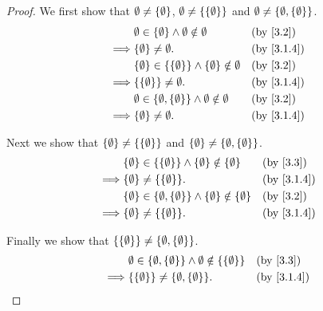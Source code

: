 \begin{proof}
  We first show that \(\emptyset \neq \left\lbrace\emptyset\right\rbrace\), \(\emptyset \neq \left\lbrace\left\lbrace\emptyset\right\rbrace\right\rbrace\) and \(\emptyset \neq \left\lbrace\emptyset, \left\lbrace\emptyset\right\rbrace\right\rbrace\).
  \begin{align*}
             & \emptyset \in \set{\emptyset} \land \emptyset \notin \emptyset                   &  & \by{3.2}   \\
    \implies & \set{\emptyset} \neq \emptyset.                                                  &  & \by{3.1.4} \\
             & \set{\emptyset} \in \set{\set{\emptyset}} \land \set{\emptyset} \notin \emptyset &  & \by{3.2}   \\
    \implies & \set{\set{\emptyset}} \neq \emptyset.                                            &  & \by{3.1.4} \\
             & \emptyset \in \set{\emptyset, \set{\emptyset}} \land \emptyset \notin \emptyset  &  & \by{3.2}   \\
    \implies & \set{\emptyset} \neq \emptyset.                                                  &  & \by{3.1.4}
  \end{align*}

  Next we show that \(\left\lbrace\emptyset\right\rbrace \neq \left\lbrace\left\lbrace\emptyset\right\rbrace\right\rbrace\) and \(\left\lbrace\emptyset\right\rbrace \neq \left\lbrace\emptyset, \left\lbrace\emptyset\right\rbrace\right\rbrace\).
  \begin{align*}
             & \set{\emptyset} \in \set{\set{\emptyset}} \land \set{\emptyset} \notin \set{\emptyset}            &  & \by{3.3}   \\
    \implies & \set{\emptyset} \neq \set{\set{\emptyset}}.                                                       &  & \by{3.1.4} \\
             & \set{\emptyset} \in \set{\emptyset, \set{\emptyset}} \land \set{\emptyset} \notin \set{\emptyset} &  & \by{3.2}   \\
    \implies & \set{\emptyset} \neq \set{\set{\emptyset}}.                                                       &  & \by{3.1.4}
  \end{align*}

  Finally we show that \(\left\lbrace\left\lbrace\emptyset\right\rbrace\right\rbrace \neq \left\lbrace\emptyset, \left\lbrace\emptyset\right\rbrace\right\rbrace\).
  \begin{align*}
             & \emptyset \in \set{\emptyset, \set{\emptyset}} \land \emptyset \notin \set{\set{\emptyset}} &  & \by{3.3}   \\
    \implies & \set{\set{\emptyset}} \neq \set{\emptyset, \set{\emptyset}}.                                &  & \by{3.1.4}
  \end{align*}
\end{proof}

